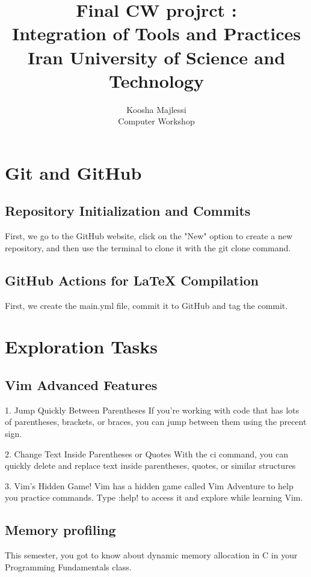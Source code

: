 \documentclass[12pt]{article}
\title{
    \vspace{2in}
    \textbf{Final CW projrct :}\\
    \textbf{Integration of Tools and Practices}\\
    \large Iran University of Science and Technology\\
    \vspace{2in}
}
\author{
    \vspace{0.5in}
    Koosha Majlessi\\
    Computer Workshop\\
    \vspace{0.5in}
}
\begin{document}
\begin{titlepage}
    \maketitle
    \thispagestyle{empty}
\end{titlepage}

\newpage

\section{Git and GitHub}
\subsection{Repository Initialization and Commits}
First, we go to the GitHub website, click on the "New" option to create a new repository, and then use the terminal to clone it with the git clone command.

\subsection{GitHub Actions for LaTeX Compilation}
First, we create the main.yml file, commit it to GitHub and tag the commit.


\section{Exploration Tasks}
\subsection{Vim Advanced Features}
1. Jump Quickly Between Parentheses
If you're working with code that has lots of parentheses, brackets, or braces, you can jump between them using the precent sign.

2. Change Text Inside Parentheses or Quotes
With the ci command, you can quickly delete and replace text inside parentheses, quotes, or similar structures

3. Vim's Hidden Game!
Vim has a hidden game called Vim Adventure to help you practice commands. Type :help! to access it and explore while learning Vim.
\subsection{Memory profiling}
This semester, you got to know about dynamic memory allocation in C in your Programming Fundamentals class.
\end{document}
